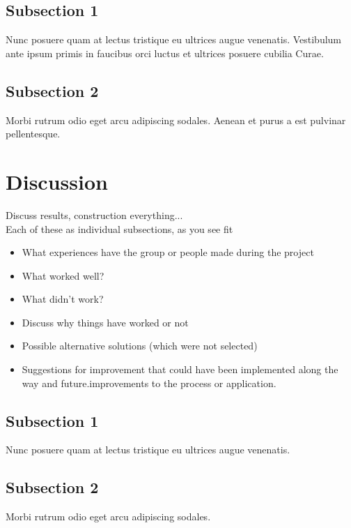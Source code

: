 \subsection{Subsection 1}

Nunc posuere quam at lectus tristique eu ultrices augue venenatis. Vestibulum ante ipsum primis in faucibus orci luctus et ultrices posuere cubilia Curae.


\subsection{Subsection 2}
Morbi rutrum odio eget arcu adipiscing sodales. Aenean et purus a est pulvinar pellentesque. 


\section{Discussion}

Discuss results, construction everything...\\

Each of these as individual subsections, as you see fit\\
\begin{itemize}
    \item What experiences have the group or people made during the project
    \item What worked well?
    \item What didn't work?
    \item Discuss why things have worked or not
    \item Possible alternative solutions (which were not selected)
    \item Suggestions for improvement that could have been implemented along the way and future.improvements to the process or application. 
\end{itemize}

\subsection{Subsection 1}

Nunc posuere quam at lectus tristique eu ultrices augue venenatis. 


\subsection{Subsection 2}
Morbi rutrum odio eget arcu adipiscing sodales. 